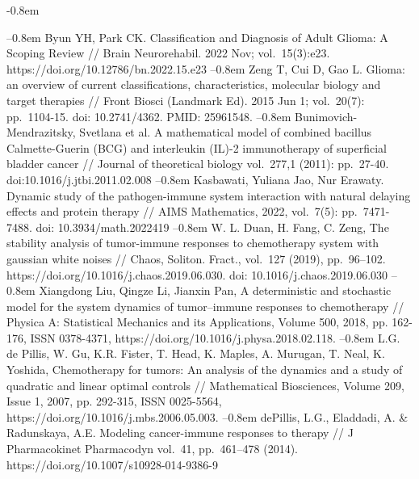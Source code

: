 \documentclass[14pt,a4paper]{extarticle}
\begin{document}
	\def\bibindent{-0.8em}
	\begin{thebibliography}{\kern\bibindent} \makeatletter \let\old@biblabel\@biblabel \def\@biblabel#1{\hspace{12.5 mm}\old@biblabel{#1}\kern\bibindent} \let\old@bibitem\bibitem \def\bibitem#1{\old@bibitem{#1}\leavevmode\kern-\bibindent} \makeatother
		
		Byun YH, Park CK. Classification and Diagnosis of Adult Glioma: A Scoping Review // Brain Neurorehabil. 2022 Nov; vol.~15(3):e23. https://doi.org/10.12786/bn.2022.15.e23
		Zeng T, Cui D, Gao L. Glioma: an overview of current classifications, characteristics, molecular biology and target therapies // Front Biosci (Landmark Ed). 2015 Jun 1; vol.~20(7): pp.~1104-15. doi: 10.2741/4362. PMID: 25961548.
		Bunimovich-Mendrazitsky, Svetlana et al. A mathematical model of combined bacillus Calmette-Guerin (BCG) and interleukin (IL)-2 immunotherapy of superficial bladder cancer // Journal of theoretical biology vol.~277,1 (2011): pp.~27-40. doi:10.1016/j.jtbi.2011.02.008
		Kasbawati, Yuliana Jao, Nur Erawaty. Dynamic study of the pathogen-immune system interaction with natural delaying effects and protein therapy // AIMS Mathematics, 2022, vol.~7(5): pp.~7471-7488. doi: 10.3934/math.2022419
		W. L. Duan, H. Fang, C. Zeng, The stability analysis of tumor-immune responses to chemotherapy system with gaussian white noises // Chaos, Soliton. Fract., vol.~127 (2019), pp.~96–102. https://doi.org/10.1016/j.chaos.2019.06.030. doi: 10.1016/j.chaos.2019.06.030 
		Xiangdong Liu, Qingze Li, Jianxin Pan, A deterministic and stochastic model for the system dynamics of tumor–immune responses to chemotherapy // Physica A: Statistical Mechanics and its Applications, Volume 500, 2018, pp. 162-176, ISSN 0378-4371, https://doi.org/10.1016/j.physa.2018.02.118.
		L.G. de Pillis, W. Gu, K.R. Fister, T. Head, K. Maples, A. Murugan, T. Neal, K. Yoshida, Chemotherapy for tumors: An analysis of the dynamics and a study of quadratic and linear optimal controls // Mathematical Biosciences, Volume 209, Issue 1, 2007, pp. 292-315, ISSN 0025-5564, https://doi.org/10.1016/j.mbs.2006.05.003.
		dePillis, L.G., Eladdadi, A. \& Radunskaya, A.E. Modeling cancer-immune responses to therapy // J Pharmacokinet Pharmacodyn vol.~41, pp.~461–478 (2014). https://doi.org/10.1007/s10928-014-9386-9

\end{thebibliography}
\end{document}

